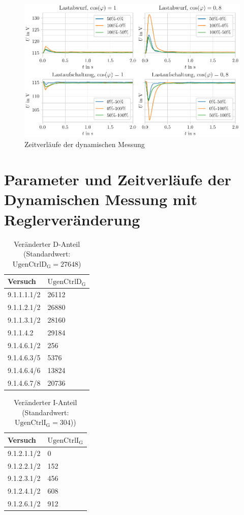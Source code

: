\begin{figure}[H]
	\centering
	\includegraphics{Bilder/DynamischeMessung.pdf}
	\caption{Zeitverläufe der dynamischen Messung}
	\label{fig:ZeitverlaufDynamischOhneRegleraenderung}
\end{figure}

\section{Parameter und Zeitverläufe der Dynamischen Messung mit Reglerveränderung}
\label{sec:ReglerparameterDynamischeMessung}

\begin{longtable}[]{ll}
    \caption{Veränderter D-Anteil (Standardwert: $\mathrm{UgenCtrlD_G}=27648$)}
    \label{tab:Parameter-D-Messung}
    \tabularnewline
    \toprule
    Versuch     & $\mathrm{UgenCtrlD_G}$ \\
    \midrule
    \endhead
    9.1.1.1.1/2 & 26112        \\
    9.1.1.2.1/2 & 26880        \\
    9.1.1.3.1/2 & 28160        \\
    9.1.1.4.2 & 29184        \\
    9.1.4.6.1/2 & 256          \\
    9.1.4.6.3/5 & 5376         \\
    9.1.4.6.4/6 & 13824        \\
    9.1.4.6.7/8 & 20736        \\
    \bottomrule
\end{longtable}

\begin{longtable}[]{ll}
    \caption{Veränderter I-Anteil (Standardwert: $\mathrm{UgenCtrlI_G}=304$))}
    \label{tab:Parameter-I-Messung}
    \tabularnewline
    \toprule
    Versuch     & $\mathrm{UgenCtrlI_G}$ \\
    \midrule
    \endhead
        9.1.2.1.1/2 & 0            \\
        9.1.2.2.1/2 & 152          \\
        9.1.2.3.1/2 & 456          \\
        9.1.2.4.1/2 & 608          \\
        9.1.2.6.1/2 & 912          \\
    \bottomrule
\end{longtable}

